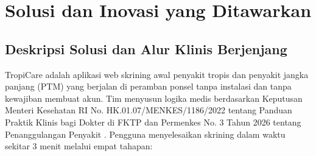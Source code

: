
\section{Solusi dan Inovasi yang Ditawarkan}

\subsection{Deskripsi Solusi dan Alur Klinis Berjenjang}

TropiCare adalah aplikasi web skrining awal penyakit tropis dan penyakit jangka panjang (PTM) yang berjalan di peramban ponsel tanpa instalasi dan tanpa kewajiban membuat akun. Tim menyusun logika medis berdasarkan Keputusan Menteri Kesehatan RI No. HK.01.07/MENKES/1186/2022 tentang Panduan Praktik Klinis bagi Dokter di FKTP \citep{Kemenkes2022a} dan Permenkes No. 3 Tahun 2026 tentang Penanggulangan Penyakit \citep{Permenkes2026}. Pengguna menyelesaikan skrining dalam waktu sekitar 3 menit melalui empat tahapan:

